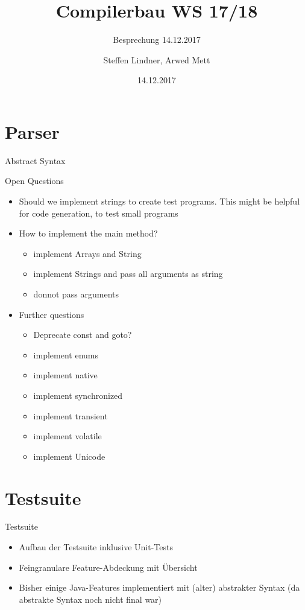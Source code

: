 \documentclass[9pt, handout]{beamer}
\title{Compilerbau WS 17/18}
\subtitle{Besprechung 14.12.2017}
\author{Steffen Lindner, Arwed Mett}
\institute{steffen.lindner@uni-tuebingen.de, arwed.mett@student.uni-tuebingen.de}
\date{14.12.2017}
\begin{document}
\maketitle

\section{Parser}

\begin{frame}[t]{Abstract Syntax}
	\centering
\end{frame}

\begin{frame}[t]{Open Questions}

	\begin{itemize}
		\item Should we implement strings to create test programs.
			This might be helpful for code generation, to test small programs
		\item How to implement the main method?
			\begin{itemize}
				\item implement Arrays and String
				\item implement Strings and pass all arguments as string
				\item donnot pass arguments
			\end{itemize}
		\item Further questions
			\begin{itemize}
				\item Deprecate const and goto?
				\item implement enums
				\item implement native
				\item implement synchronized
				\item implement transient
				\item implement volatile
				\item implement Unicode
			\end{itemize}
	\end{itemize}

\end{frame}

\section{Testsuite}

\begin{frame}{Testsuite}

	\begin{itemize}
		\item Aufbau der Testsuite inklusive Unit-Tests \pause 
		\item Feingranulare Feature-Abdeckung mit Übersicht \pause
		\item Bisher einige Java-Features implementiert mit (alter) abstrakter Syntax (da abstrakte Syntax noch nicht final war)
	\end{itemize}
	
\end{frame}
\end{document}
